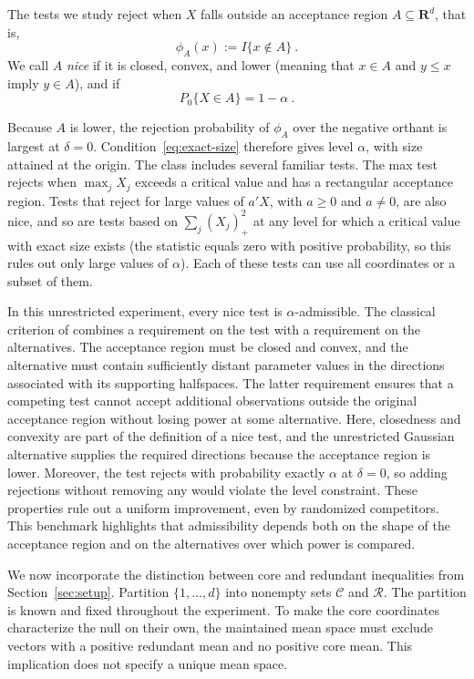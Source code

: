 \documentclass[11pt]{article}
\numberwithin{equation}{section}
\theoremstyle{definition}
\begin{document}
The tests we study reject when $X$ falls outside an acceptance region $A\subseteq\mathbf R^d$, that is, 
$$\phi_A(x):=I\{x\notin A\}~.$$
We call $A$ \emph{nice} if it is closed, convex, and lower (meaning that $x\in A$ and $y\le x$ imply $y\in A$), and if
\begin{equation}\label{eq:exact-size}
P_0\{X\in A\}=1-\alpha~.
\end{equation}

Because $A$ is lower, the rejection probability of $\phi_A$ over the negative orthant is largest at $\delta=0$. Condition~\eqref{eq:exact-size} therefore gives level $\alpha$, with size attained at the origin. The class includes several familiar tests. The max test rejects when $\max_jX_j$ exceeds a critical value and has a rectangular acceptance region. Tests that reject for large values of $a'X$, with $a\ge0$ and $a\ne0$, are also nice, and so are tests based on $\sum_j(X_j)_+^2$ at any level for which a critical value with exact size exists (the statistic equals zero with positive probability, so this rules out only large values of $\alpha$). Each of these tests can use all coordinates or a subset of them.

In this unrestricted experiment, every nice test is $\alpha$-admissible. The classical criterion of \citet[Theorem~6.7.1 and Corollary~6.7.1]{lehmann/romano:05} combines a requirement on the test with a requirement on the alternatives. The acceptance region must be closed and convex, and the alternative must contain sufficiently distant parameter values in the directions associated with its supporting halfspaces. The latter requirement ensures that a competing test cannot accept additional observations outside the original acceptance region without losing power at some alternative. Here, closedness and convexity are part of the definition of a nice test, and the unrestricted Gaussian alternative supplies the required directions because the acceptance region is lower. Moreover, the test rejects with probability exactly $\alpha$ at $\delta=0$, so adding rejections without removing any would violate the level constraint. These properties rule out a uniform improvement, even by randomized competitors. This benchmark highlights that admissibility depends both on the shape of the acceptance region and on the alternatives over which power is compared.

We now incorporate the distinction between core and redundant inequalities from Section~\ref{sec:setup}. Partition $\{1,\dots,d\}$ into nonempty sets $\mathcal C$ and $\mathcal R$. The partition is known and fixed throughout the experiment. To make the core coordinates characterize the null on their own, the maintained mean space must exclude vectors with a positive redundant mean and no positive core mean. This implication does not specify a unique mean space.
\end{document}
